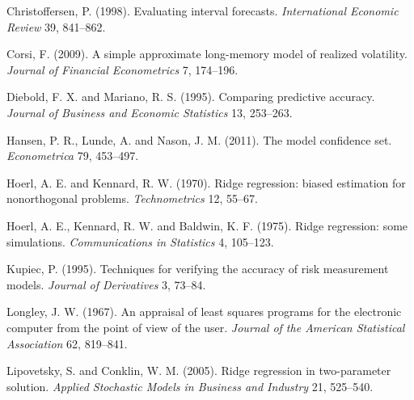 \documentclass[11pt,a4paper]{report}
\begin{document}
\noindent
Christoffersen, P. (1998). Evaluating interval forecasts.
\emph{International Economic Review} 39, 841--862.

\noindent
Corsi, F. (2009). A simple approximate long-memory model of realized
volatility. \emph{Journal of Financial Econometrics} 7, 174--196.

\noindent
Diebold, F. X. and Mariano, R. S. (1995). Comparing predictive accuracy.
\emph{Journal of Business and Economic Statistics} 13, 253--263.

\noindent
Hansen, P. R., Lunde, A. and Nason, J. M. (2011). The model confidence
set. \emph{Econometrica} 79, 453--497.

\noindent
Hoerl, A. E. and Kennard, R. W. (1970). Ridge regression: biased
estimation for nonorthogonal problems. \emph{Technometrics} 12, 55--67.

\noindent
Hoerl, A. E., Kennard, R. W. and Baldwin, K. F. (1975). Ridge
regression: some simulations. \emph{Communications in Statistics} 4,
105--123.

\noindent
Kupiec, P. (1995). Techniques for verifying the accuracy of risk
measurement models. \emph{Journal of Derivatives} 3, 73--84.

\noindent
Longley, J. W. (1967). An appraisal of least squares programs for the
electronic computer from the point of view of the user. \emph{Journal of
the American Statistical Association} 62, 819--841.

\noindent
Lipovetsky, S. and Conklin, W. M. (2005). Ridge regression in
two-parameter solution. \emph{Applied Stochastic Models in Business and
Industry} 21, 525--540.
\end{document}
